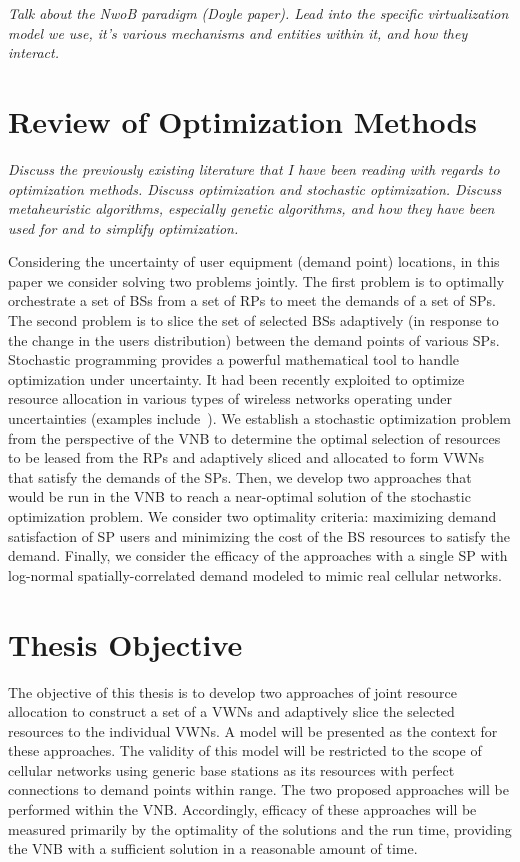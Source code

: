 \documentclass[12pt,dvips]{report}
\begin{document}
\textit{Talk about the NwoB paradigm (Doyle paper).  Lead into the specific virtualization model we use, it's various mechanisms and entities within it, and how they interact.}

\section{Review of Optimization Methods} \label{sec:optreview}

\textit{Discuss the previously existing literature that I have been reading with regards to optimization methods.  Discuss optimization and stochastic optimization.  Discuss metaheuristic algorithms, especially genetic algorithms, and how they have been used for and to simplify optimization.}

Considering the uncertainty of user equipment (demand point) locations, in this paper we consider solving two problems jointly.  The first problem is to optimally orchestrate a set of BSs from a set of RPs to meet the demands of a set of SPs.  The second problem is to slice the set of selected BSs adaptively (in response to the change in the users distribution) between the demand points of various SPs.  Stochastic programming provides a powerful mathematical tool to handle optimization under uncertainty.  It had been recently exploited to optimize resource allocation in various types of wireless networks operating under uncertainties (examples include~\cite{MJ_TW_13, CC_OFDMA, MJ_MECOMM_17, MJ_CCNC_16, MJ_WCNC_16, MJ_DySPAN_15, CC_video}).  We establish a stochastic optimization problem from the perspective of the VNB to determine the optimal selection of resources to be leased from the RPs and adaptively sliced and allocated to form VWNs that satisfy the demands of the SPs.  Then, we develop two approaches that would be run in the VNB to reach a near-optimal solution of the stochastic optimization problem.  We consider two optimality criteria: maximizing demand satisfaction of SP users and minimizing the cost of the BS resources to satisfy the demand.  Finally, we consider the efficacy of the approaches with a single SP with log-normal spatially-correlated demand modeled to mimic real cellular networks.

\section{Thesis Objective} \label{sec:objective}

The objective of this thesis is to develop two approaches of joint resource allocation to construct a set of a VWNs and adaptively slice the selected resources to the individual VWNs.  A model will be presented as the context for these approaches.  The validity of this model will be restricted to the scope of cellular networks using generic base stations as its resources with perfect connections to demand points within range.  The two proposed approaches will be performed within the VNB.  Accordingly, efficacy of these approaches will be measured primarily by the optimality of the solutions and the run time, providing the VNB with a sufficient solution in a reasonable amount of time.
\end{document}
